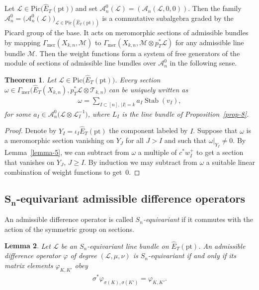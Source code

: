 \documentclass[pdftex]{sigma}
\numberwithin{equation}{section}
\newtheorem{Theorem}{Theorem}[section]
\newtheorem{Lemma}[Theorem]{Lemma}
\begin{document}
Let $\mathcal L\!\in\!\mathrm{Pic}\big(\hat E_T(\mathrm{pt})\big)$ and set $\mathcal A^0_n(\mathcal L)=(\mathcal A_n(\mathcal L,0,0))$. Then the family $\mathcal A_n^0=\big(\mathcal A^0_n(\mathcal L)\big)_{\mathcal L \in \mathrm{Pic}(\hat E_T(\mathrm{pt}))}$ is a commutative subalgebra graded by the Picard group of the base. It acts on meromorphic sections of admissible bundles by mapping $\Gamma_{\mathrm{mer}}(X_{k,n},\mathcal M)$ to $\Gamma_{\mathrm{mer}}(X_{k,n},\mathcal M\otimes p_T^*\mathcal L)$ for any admissible line bundle $\mathcal M$. Then the weight functions form a system of free generators of the module of sections of admissible line bundles over $\mathcal A^0_n$ in the following sense.
\begin{Theorem}\label{th-1} Let $\mathcal L\in\mathrm{Pic}\big(\hat E_T(\mathrm{pt})\big)$. Every section $\omega\in \Gamma_{\mathrm{mer}}\big(\hat E_T(X_{k,n}),p_T^*\mathcal L\otimes\mathcal T_{k,n}\big)$ can be uniquely written as
 \begin{gather*}
 \omega=\sum_{I\subset [n],\,|I|=k} a_I \operatorname{Stab}(v_I),
 \end{gather*}
 for some $a_I\in\mathcal A^0_n\big(\mathcal L\otimes\mathcal L_I^{-1}\big)$, where $L_I$ is the line bundle of Proposition~{\rm \ref{prop-8}}.
\end{Theorem}
\begin{proof} Denote by $Y_I=\iota_I\hat E_T(\mathrm{pt})$ the component labeled by $I$. Suppose that $\omega$ is a meromorphic section vanishing on $Y_J$ for all $J>I$ and such that $\omega|_{Y_I}\neq 0$. By Lemma~\ref{lemma-5}, we can subtract from $\omega$ a multiple of $c ^*w_I^+$ to get a section that vanishes on $Y_J$, $J\geq I$. By induction we may subtract from $\omega$ a suitable linear combination of weight functions to get~$0$.
\end{proof}

\subsection[$S_n$-equivariant admissible difference operators]{$\boldsymbol{S_n}$-equivariant admissible difference operators}
\begin{Definition} An admissible difference operator is called {\em $S_n$-equivariant} if it commutes with the action of the symmetric group on sections.
\end{Definition}

\begin{Lemma}\label{l-equiv} Let $\mathcal L$ be an $S_n$-equivariant line bundle on $\hat E_T(\mathrm{pt})$. An admissible difference operator $\varphi$ of degree $(\mathcal L,\mu,\nu)$ is $S_n$-equivariant if and only if its matrix elements $\varphi_{K,K'}$ obey
 \begin{gather*}
 \sigma^*\varphi_{\sigma(K),\sigma(K')}=\varphi_{K,K'}.
 \end{gather*}
\end{Lemma}
\end{document}
